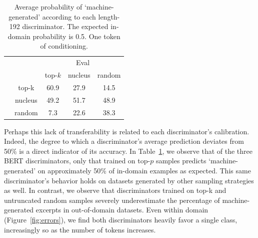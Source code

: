\begin{table}[t]
  \small
  \centering
  \caption{Average probability of `machine-generated' according to each length-192 discriminator. The expected in-domain probability is 0.5. One token of conditioning.}
  \label{tab:transfer-prediction}
  \begin{tabular}{c c|c|c|c}
    \toprule
    & & \multicolumn{3}{c}{Eval} \\
    \cline{3-5}
    &            & top-$k$         & nucleus & random \\
    \hline
    \multirow{3}{0.7em}{\rotatebox[origin=c]{90}{\parbox[c]{1cm}{\centering Train}}} 
    & \multicolumn{1}{|c|}{top-k}   & 60.9 & 27.9 & 14.5 \\
    & \multicolumn{1}{|c|}{nucleus} & 49.2 & 51.7 & 48.9 \\
    & \multicolumn{1}{|c|}{random}  &  7.3 & 22.6 & 38.3 \\
    \bottomrule
  \end{tabular}
\end{table}

Perhaps this lack of transferability is related to each discriminator's calibration.
Indeed, the degree to which a discriminator's average prediction deviates from 50\% is a direct indicator of its accuracy. 
In Table~\ref{tab:transfer-prediction}, we observe that of the three BERT discriminators, only that trained on top-$p$ samples predicts `machine-generated' on approximately 50\% of in-domain examples as expected. 
This same discriminator's behavior holds on datasets generated by other sampling strategies as well. 
In contrast, we observe that discriminators trained on top-k and untruncated random samples severely underestimate the percentage of machine-generated excerpts in out-of-domain datasets.
Even within domain (Figure~\ref{fig:errors}), we find both discriminators heavily favor a single class, increasingly so as the number of tokens increases.


